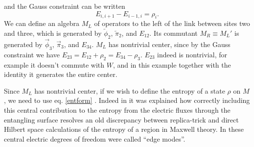 \documentclass[12pt]{article}
\newcommand{\be}{\begin{equation}}
\newcommand{\ee}{\end{equation}}
\begin{document}
and the Gauss constraint can be written 
\be\label{gauss2}
E_{i,i+1}-E_{i-1,i}=\rho_i.
\ee
We can define an algebra $M_L$ of operators to the left of the link between sites two and three, which is generated by $\overleftarrow{\phi}_2$, $\overleftarrow{\pi}_2$, and $E_{12}$.  Its commutant $M_R\equiv M_L'$ is generated by $\overrightarrow{\phi}_3$, $\overrightarrow{\pi}_3$, and $E_{34}$.  $M_L$ has nontrivial center, since by the Gauss constraint we have $E_{23}=E_{12}+\rho_2=E_{34}-\rho_3$.  $E_{23}$ indeed is nontrivial, for example it doesn't commute with $W$, and in this example together with the identity it generates the entire center.  

Since $M_L$ has nontrivial center, if we wish to define the entropy of a state $\rho$ on $M$, we need to use eq. \eqref{entform}  \cite{Casini:2013rba}.  Indeed in \cite{Donnelly:2014fua,Donnelly:2015hxa} it was explained how correctly including this central contribution to the entropy from the electric fluxes through the entangling surface resolves an old discrepancy \cite{Kabat:1995eq} between replica-trick and direct Hilbert space calculations of the entropy of a region in Maxwell theory. In \cite{Donnelly:2014fua,Donnelly:2015hxa} these central electric degrees of freedom were called ``edge modes''.  
\end{document}
